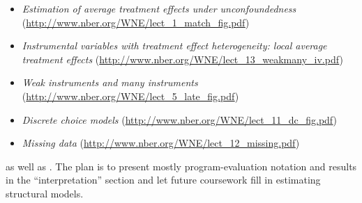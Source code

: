 \begin{itemize}[leftmargin=0pt]
  \begin{itemize}
  \item \textit{Estimation of average treatment effects under
      unconfoundedness}
    (\url{http://www.nber.org/WNE/lect_1_match_fig.pdf})
  \item \textit{Instrumental variables with treatment effect
      heterogeneity: local average treatment effects}
    (\url{http://www.nber.org/WNE/lect_13_weakmany_iv.pdf})
  \item \textit{Weak instruments and many instruments}
    (\url{http://www.nber.org/WNE/lect_5_late_fig.pdf})
  \item \textit{Discrete choice models}
    (\url{http://www.nber.org/WNE/lect_11_dc_fig.pdf})
  \item \textit{Missing data}
    (\url{http://www.nber.org/WNE/lect_12_missing.pdf})
  \end{itemize}
  as well as \citet{IW09}. The plan is to present mostly
  program-evaluation notation and results in the ``interpretation''
  section and let future coursework fill in estimating structural
  models.

\end{itemize}

